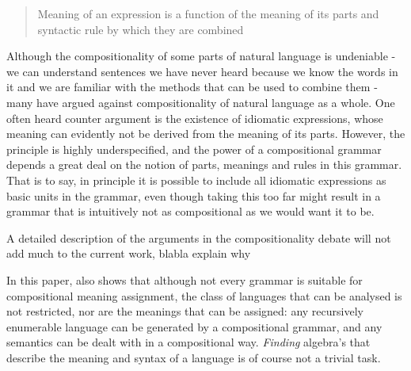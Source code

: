 \documentclass{report}
\theoremstyle{definition}
\theoremstyle{plain}
\begin{document}
\begin{quote}
Meaning of an expression is a function of the meaning of its parts and syntactic rule by which they are combined \cite{partee1984compositionality}
\end{quote}

Although the compositionality of some parts of natural language is undeniable - we can understand sentences we have never heard because we know the words in it and we are familiar with the methods that can be used to combine them - many have argued against compositionality of natural language as a whole. One often heard counter argument is the existence of idiomatic expressions, whose meaning can evidently not be derived from the meaning of its parts. However, the principle is highly underspecified, and the power of a compositional grammar depends a great deal on the notion of parts, meanings and rules in this grammar. That is to say, in principle it is possible to include all idiomatic expressions as basic units in the grammar, even though taking this too far might result in a grammar that is intuitively not as compositional as we would want it to be.

A detailed description of the arguments in the compositionality debate will not add much to the current work, 
blabla explain why

In this paper, \citeauthor{janssen1996compositionality} also shows that although not every grammar is suitable for compositional meaning assignment, the class of languages that can be analysed is not restricted, nor are the meanings that can be assigned: any recursively enumerable language can be generated by a compositional grammar, and any semantics can be dealt with in a compositional way. \textit{Finding} algebra's that describe the meaning and syntax of a language is of course not a trivial task.
\end{document}
